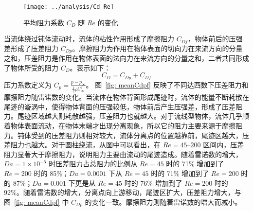 
\begin{figure}
	\centering
	\texttt{[image: ../analysis/Cd\_Re]}
	\caption{平均阻力系数 $C_D$ 随 $Re$ 的变化}
	\label{fig: meanCd}
\end{figure}

当流体绕过钝体流动时，流体的粘性作用形成了摩擦阻力 $C_{Df}$，物体前后的压强差形成了压差阻力 $C_{Dp}$。摩擦阻力为作用在物体表面的切向力在来流方向的分量之和，压差阻力是作用在物体表面的法向力在来流方向的分量之和，二者共同形成了物体所受的阻力 $C_{D}$。表示如下：
\begin{equation}
	C_D = C_{Dp} + C_{Df}
\end{equation}
压力系数定义为 $C_p = \frac{p-p_{\infty}}{\frac12\rho U_{\infty}^2}$。
图~\ref{fig: meanCdpf} 反映了不同达西数下压差阻力和摩擦阻力随雷诺数的变化。当流体在物体背面形成尾迹时，流体的能量不断耗散在尾迹的漩涡中，使得物体背面的压强较低，物体前后产生压强差，形成了压差阻力。尾迹区域越大则耗散越强，压差阻力也就越大。对于流线型物体，流体几乎顺着物体表面流动，在物体末端才出现分离现象，所以它的阻力主要来源于摩擦阻力。钝体受到的压差阻力则相对较大，流体分离点的位置越靠前，尾迹区越大，压差阻力也越大。对于圆柱绕流，从图中可以看出，在 $Re=45$--$200$ 区间内，压差阻力显著大于摩擦阻力，说明阻力主要由流动的尾迹造成。随着雷诺数的增大，$Da=1\times 10^{-5}$ 时压差阻力占总阻力的比例从 $Re=45$ 时的 71\% 增加到了 $Re=200$ 时的 85\%；$Da=0.0001$ 下从 $Re=45$ 时的 71\% 增加到了 $Re=200$ 时的 87\%；$Da=0.001$ 下更是从 $Re=45$ 时的 76\% 增加到了 $Re=200$ 时的 92\%。随着雷诺数的增大，分离点向上游移动，尾迹区扩大，压差阻力增大，与图~\ref{fig: meanCdpf} 中 $C_{Dp}$ 的变化一致。摩擦阻力则随着雷诺数的增大而减小。%


